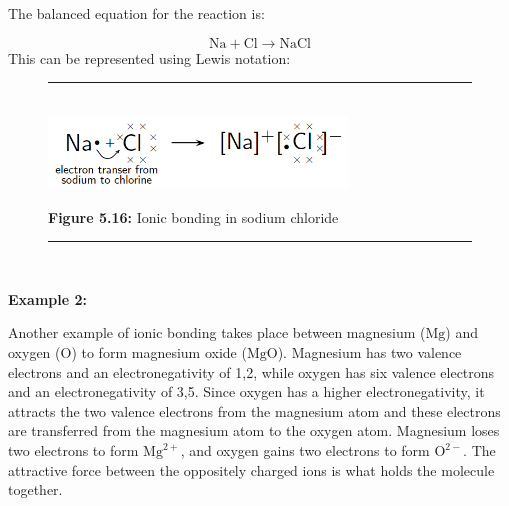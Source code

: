         \label{m38684*id142300}The balanced equation for the reaction is:\par 
        \label{m38684*id142305}\nopagebreak\noindent{}
    \begin{equation}
    \mathrm{Na}+\mathrm{Cl}\to \mathrm{NaCl}\tag{5.1}
      \end{equation}
        \label{m38684*id142337}This can be represented using Lewis notation:\par 
    \setcounter{subfigure}{0}
	\begin{figure}[H] %
    \begin{center}
    \rule[.1in]{\figurerulewidth}{.005in} \\
        \label{m38684*uid55!!!underscore!!!media}\label{m38684*uid55!!!underscore!!!printimage}\includegraphics[width=300px]{col11305.imgs/m38684_CG11C1_019.png} %
      \vspace{2pt}
    \vspace{\rubberspace}\par \begin{cnxcaption}
	  \small \textbf{Figure 5.16: }Ionic bonding in sodium chloride
	\end{cnxcaption}
    \vspace{.1in}
    \rule[.1in]{\figurerulewidth}{.005in} \\
    \end{center}
 \end{figure}       
        \label{m38684*id142353}
          \textbf{Example 2:}
        \par 
        \label{m38684*id142360}Another example of ionic bonding takes place between magnesium ($\mathrm{Mg}$) and oxygen ($\mathrm{O}$) to form magnesium oxide ($\mathrm{MgO}$). Magnesium has two valence electrons and an electronegativity of 1,2, while oxygen has six valence electrons and an electronegativity of 3,5. Since oxygen has a higher electronegativity, it attracts the two valence electrons from the magnesium atom and these electrons are transferred from the magnesium atom to the oxygen atom. Magnesium loses two electrons to form ${\mathrm{Mg}}^{2+}$, and oxygen gains two electrons to form ${\mathrm{O}}^{2-}$. The attractive force between the oppositely charged ions is what holds the molecule together.\par 
